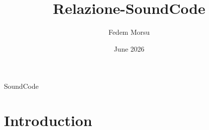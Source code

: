 \documentclass{article}
\title{Relazione-SoundCode}
\author{Fedem Morsu}
\date{June 2026}
\begin{document}
    \maketitle SoundCode

    \section{Introduction}
\end{document}
